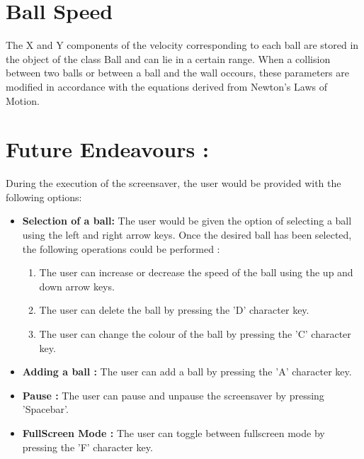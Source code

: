 \documentclass[]{article}
\begin{document}
\section{Ball Speed}
\begin{flushleft}
The X and Y components of the velocity corresponding to each ball are stored in the  object of the class Ball and can lie in a certain range. When a collision between two balls or between a ball and the wall occours, these parameters are modified in accordance with the equations derived from Newton's Laws of Motion.  
\end{flushleft}

\section{Future Endeavours :}
\begin{flushleft} 
During the execution of the screensaver, the user would be provided with the following options:
\begin{itemize}
\item \textbf{Selection of a ball:}
The user would be given the option of selecting a ball using the left and right arrow keys. Once the desired ball has been selected, the following operations could be performed :
\begin{enumerate}

\item The user can increase or decrease the speed of the ball using the up and down arrow keys. 

\item The user can delete the ball by pressing the 'D' character key. 

\item The user can change the colour of the ball by pressing the 'C' character key.
\end{enumerate}

\item \textbf{Adding a ball :}
The user can add a ball by pressing the 'A' character key.

\item\textbf{Pause :}
The user can pause and unpause the screensaver by pressing 'Spacebar'.

\item \textbf{FullScreen Mode :}
The user can toggle between fullscreen mode by pressing the 'F' character key.

\end{itemize}
\end{flushleft}
\end{document}
